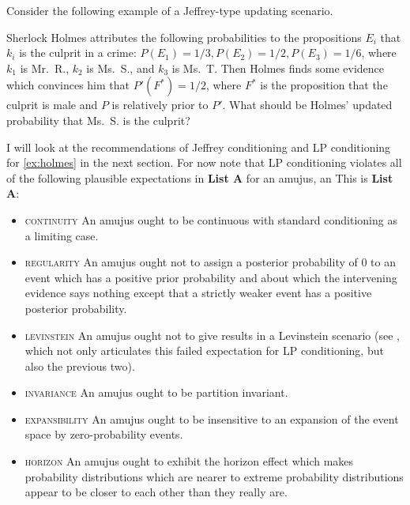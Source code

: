 \documentclass[smallextended]{svjour3}       %
\begin{document}
Consider the following example of a Jeffrey-type updating scenario.

\begin{quotex}
  \label{ex:holmes} Sherlock Holmes
  attributes the following probabilities to the propositions $E_{i}$
  that $k_{i}$ is the culprit in a crime:
  $P(E_{1})=1/3,P(E_{2})=1/2,P(E_{3})=1/6$, where $k_{1}$ is Mr.\ R.,
  $k_{2}$ is Ms.\ S., and $k_{3}$ is Ms.\ T. Then Holmes finds some
  evidence which convinces him that $P'(F^{*})=1/2$, where $F^{*}$ is
  the proposition that the culprit is male and $P$ is relatively prior
  to $P'$. What should be Holmes' updated probability that Ms.\ S. is
  the culprit?
\end{quotex}

I will look at the recommendations of Jeffrey conditioning and LP
conditioning for {\xample} \ref{ex:holmes} in the next section. For
now note that LP conditioning violates all of the following plausible
expectations in \textbf{List A}\label{page:listone} for an amujus, an
 This is \textbf{List A}:

\begin{itemize}
\item \textsc{continuity} An amujus ought to be continuous with
  standard conditioning as a limiting case.
\item \textsc{regularity} An amujus ought not to assign a posterior
  probability of $0$ to an event which has a positive prior
  probability and about which the intervening evidence says nothing
  except that a strictly weaker event has a positive posterior
  probability.
\item \textsc{levinstein} An amujus ought not to give  results in a Levinstein scenario (see
  , which not only articulates this failed
  expectation for LP conditioning, but also the previous two).
\item \textsc{invariance} An amujus ought to be partition invariant.
\item \textsc{expansibility} An amujus ought to be insensitive to an
  expansion of the event space by zero-probability events.
\item \textsc{horizon} An amujus ought to exhibit the horizon effect
  which makes probability distributions which are nearer to extreme
  probability distributions appear to be closer to each other than
  they really are.
\end{itemize}
\end{document}
